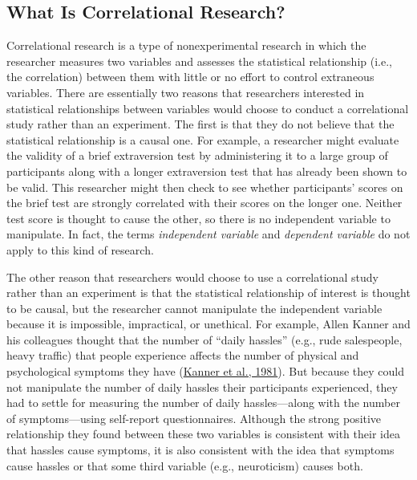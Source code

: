 \documentclass[
]{krantz}
\begin{document}
\hypertarget{what-is-correlational-research}{%
\subsection*{What Is Correlational Research?}\label{what-is-correlational-research}}


Correlational research is a type of nonexperimental research in which the researcher measures two variables and assesses the statistical relationship (i.e., the correlation) between them with little or no effort to control extraneous variables. There are essentially two reasons that researchers interested in statistical relationships between variables would choose to conduct a correlational study rather than an experiment. The first is that they do not believe that the statistical relationship is a causal one. For example, a researcher might evaluate the validity of a brief extraversion test by administering it to a large group of participants along with a longer extraversion test that has already been shown to be valid. This researcher might then check to see whether participants' scores on the brief test are strongly correlated with their scores on the longer one. Neither test score is thought to cause the other, so there is no independent variable to manipulate. In fact, the terms \emph{independent variable} and \emph{dependent variable} do not apply to this kind of research.

The other reason that researchers would choose to use a correlational study rather than an experiment is that the statistical relationship of interest is thought to be causal, but the researcher cannot manipulate the independent variable because it is impossible, impractical, or unethical. For example, Allen Kanner and his colleagues thought that the number of ``daily hassles'' (e.g., rude salespeople, heavy traffic) that people experience affects the number of physical and psychological symptoms they have (\protect\hyperlink{ref-kanner1981comparison}{Kanner et al., 1981}). But because they could not manipulate the number of daily hassles their participants experienced, they had to settle for measuring the number of daily hassles---along with the number of symptoms---using self-report questionnaires. Although the strong positive relationship they found between these two variables is consistent with their idea that hassles cause symptoms, it is also consistent with the idea that symptoms cause hassles or that some third variable (e.g., neuroticism) causes both.
\end{document}
